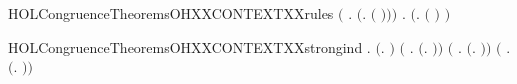 \begin{SaveVerbatim}{HOLCongruenceTheoremsOHXXCONTEXTXXrules}
   \ensuremath{(}\HOLSymConst{\HOLTokenForall{}} .   \HOLSymConst{\HOLTokenImp{}}  \ensuremath{(}\HOLTokenLambda{}.   \ensuremath{(} \ensuremath{)}\ensuremath{)}\ensuremath{)} \HOLSymConst{\HOLTokenConj{}}
   \HOLSymConst{\HOLTokenForall{}} .   \HOLSymConst{\HOLTokenImp{}}  \ensuremath{(}\HOLTokenLambda{}.  \ensuremath{(} \ensuremath{)} \ensuremath{)}
\end{SaveVerbatim}
\newcommand{\HOLCongruenceTheoremsOHXXCONTEXTXXrules}{\UseVerbatim{HOLCongruenceTheoremsOHXXCONTEXTXXrules}}
\begin{SaveVerbatim}{HOLCongruenceTheoremsOHXXCONTEXTXXstrongind}
\HOLTokenTurnstile{} \HOLSymConst{\HOLTokenForall{}}.
        \ensuremath{(}\HOLTokenLambda{}. \ensuremath{)} \HOLSymConst{\HOLTokenConj{}}
       \ensuremath{(}\HOLSymConst{\HOLTokenForall{}} .
              \HOLSymConst{\HOLTokenConj{}}   \HOLSymConst{\HOLTokenImp{}}
             \ensuremath{(}\HOLTokenLambda{}. \HOLSymConst{\ensuremath{\ldotp}} \ensuremath{)}\ensuremath{)} \HOLSymConst{\HOLTokenConj{}}
       \ensuremath{(}\HOLSymConst{\HOLTokenForall{}} .
              \HOLSymConst{\HOLTokenConj{}}   \HOLSymConst{\HOLTokenImp{}}
             \ensuremath{(}\HOLTokenLambda{}.   \HOLSymConst{\ensuremath{+}} \ensuremath{)}\ensuremath{)} \HOLSymConst{\HOLTokenConj{}}
       \ensuremath{(}\HOLSymConst{\HOLTokenForall{}} .
              \HOLSymConst{\HOLTokenConj{}}   \HOLSymConst{\HOLTokenImp{}}
             \ensuremath{(}\HOLTokenLambda{}.  \HOLSymConst{\ensuremath{+}}  \ensuremath{)}\ensuremath{)} \HOLSymConst{\HOLTokenConj{}}

\end{SaveVerbatim}
